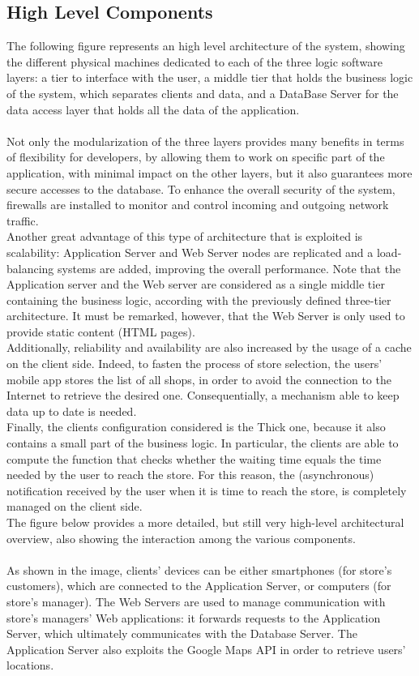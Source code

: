 \documentclass{article}
\begin{document}
\subsection{High Level Components}
The following figure represents an high level architecture of the system, showing the different physical machines dedicated to each of the three logic software layers: a tier to interface with the user, a middle tier that holds the business logic of the system, which separates clients and data, and a DataBase Server for the data access layer that holds all the data of the application. \\
\smallskip\\
Not only the modularization of the three layers provides many benefits in terms of flexibility for developers, by allowing them to work on specific part of the application, with minimal impact on the other layers, but it also guarantees more secure accesses to the database. To enhance the overall security of the system, firewalls are installed to monitor and control incoming and outgoing network traffic.
\smallskip\\
Another great advantage of this type of architecture that is exploited is scalability: Application Server and Web Server nodes are replicated and a load-balancing systems are added, improving the overall performance. Note that the Application server and the Web server are considered as a single middle tier containing the business logic, according with the previously defined three-tier architecture. It must be remarked, however, that the Web Server is only used to provide static content (HTML pages).
\smallskip\\
Additionally, reliability and availability are also increased by the usage of a cache on the client side. Indeed, to fasten the process of store selection, the users’ mobile app stores the list of all shops, in order to avoid the connection to the Internet to retrieve the desired one. Consequentially, a mechanism able to keep data up to date is needed.
\smallskip\\
Finally, the clients configuration considered is the Thick one, because it also contains a small part of the business logic. In particular, the clients are able to compute the function that checks whether the waiting time equals the time needed by the user to reach the store. For this reason, the (asynchronous) notification received by the user when it is time to reach the store, is completely managed on the client side.
\smallskip\\
The figure below provides a more detailed, but still very high-level architectural overview, also showing the interaction among the various components.\\
\smallskip\\
As shown in the image, clients’ devices can be either smartphones (for store’s customers), which are connected to the Application Server, or computers (for store’s manager). The Web Servers are used to manage communication with store’s managers’ Web applications: it forwards requests to the Application Server, which ultimately communicates with the Database Server. The Application Server also exploits the Google Maps API in order to retrieve users’ locations.
\end{document}
